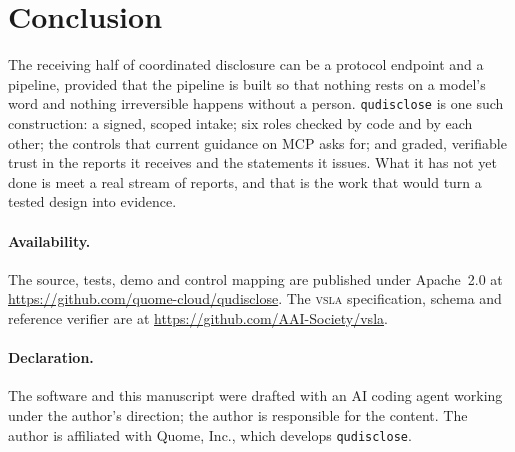\documentclass[11pt]{article}
\newcommand{\qud}{\texttt{qudisclose}}
\newcommand{\vsla}{\textsc{vsla}}
\begin{document}
\section{Conclusion}

The receiving half of coordinated disclosure can be a protocol endpoint and a pipeline, provided that the
pipeline is built so that nothing rests on a model's word and nothing irreversible happens without a person.
\qud{} is one such construction: a signed, scoped intake; six roles checked by code and by each other; the
controls that current guidance on MCP asks for; and graded, verifiable trust in the reports it receives and the
statements it issues. What it has not yet done is meet a real stream of reports, and that is the work that
would turn a tested design into evidence.

\paragraph{Availability.} The source, tests, demo and control mapping are published under Apache~2.0 at
\url{https://github.com/quome-cloud/qudisclose}. The \vsla{} specification, schema and
reference verifier are at \url{https://github.com/AAI-Society/vsla}.

\paragraph{Declaration.} The software and this manuscript were drafted with an AI coding agent working under
the author's direction; the author is responsible for the content. The author is affiliated with Quome, Inc.,
which develops \qud{}.
\end{document}
